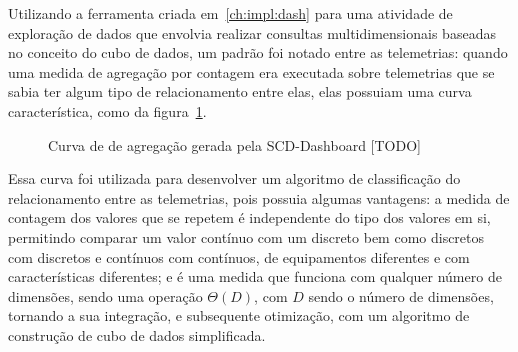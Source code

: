 Utilizando a ferramenta criada em~\ref{ch:impl:dash} para uma atividade de exploração de dados que envolvia realizar consultas multidimensionais baseadas no conceito do cubo de dados, um padrão foi notado entre as telemetrias: quando uma medida de agregação por contagem era executada sobre telemetrias que se sabia ter algum tipo de relacionamento entre elas, elas possuiam uma curva característica, como da figura~\ref{fig:scdsimilaritygraph}.

\begin{figure}[ht]
	\caption{\color{red} Curva de de agregação gerada pela SCD-Dashboard [TODO]}
	\vspace{6mm}
	\begin{center}
	\end{center}
	\vspace{4mm}
	\legenda{}
	\label{fig:scdsimilaritygraph}
\end{figure}

Essa curva foi utilizada para desenvolver um algoritmo de classificação do relacionamento entre as telemetrias, pois possuia algumas vantagens: a medida de contagem dos valores que se repetem é independente do tipo dos valores em si, permitindo comparar um valor contínuo com um discreto bem como discretos com discretos e contínuos com contínuos, de equipamentos diferentes e com características diferentes; e é uma medida que funciona com qualquer número de dimensões, sendo uma operação $\Theta(D)$, com $D$ sendo o número de dimensões, tornando a sua integração, e subsequente otimização, com um algoritmo de construção de cubo de dados simplificada.

